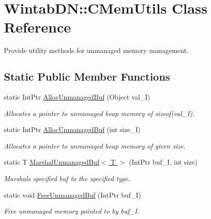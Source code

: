 \hypertarget{class_wintab_d_n_1_1_c_mem_utils}{
\section{WintabDN::CMemUtils Class Reference}
\label{class_wintab_d_n_1_1_c_mem_utils}
}


Provide utility methods for unmanaged memory management.  


\subsection*{Static Public Member Functions}
\begin{DoxyCompactItemize}
\item 
static IntPtr \hyperlink{class_wintab_d_n_1_1_c_mem_utils_a9a94990f8c6f801fce835698b10b27f9}{AllocUnmanagedBuf} (Object val\_\-I)
\begin{DoxyCompactList}\small\item\em Allocates a pointer to unmanaged heap memory of sizeof(val\_\-I). \item\end{DoxyCompactList}\item 
static IntPtr \hyperlink{class_wintab_d_n_1_1_c_mem_utils_afe424c11a6c32d0802bdfdb7e6118fd3}{AllocUnmanagedBuf} (int size\_\-I)
\begin{DoxyCompactList}\small\item\em Allocates a pointer to unmanaged heap memory of given size. \item\end{DoxyCompactList}\item 
static T \hyperlink{class_wintab_d_n_1_1_c_mem_utils_a462ef67a6a4e5fa8fe59bf37dc8b4b53}{MarshalUnmanagedBuf$<$ T $>$} (IntPtr buf\_\-I, int size)
\begin{DoxyCompactList}\small\item\em Marshals specified buf to the specified type. \item\end{DoxyCompactList}\item 
static void \hyperlink{class_wintab_d_n_1_1_c_mem_utils_a6acc474d09da4fb75e82ecfacb6bf051}{FreeUnmanagedBuf} (IntPtr buf\_\-I)
\begin{DoxyCompactList}\small\item\em Free unmanaged memory pointed to by buf\_\-I. \item\end{DoxyCompactList}\item 

\end{DoxyCompactItemize}
